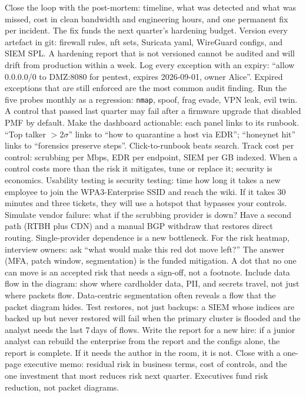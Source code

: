 Close the loop with the post-mortem: timeline, what was detected and what was missed, cost in clean bandwidth and engineering hours, and one permanent fix per incident. The fix funds the next quarter's hardening budget.
Version every artefact in git: firewall rules, nft sets, Suricata yaml, WireGuard configs, and SIEM SPL. A hardening report that is not versioned cannot be audited and will drift from production within a week.
Log every exception with an expiry: ``allow 0.0.0.0/0 to DMZ:8080 for pentest, expires 2026-09-01, owner Alice''. Expired exceptions that are still enforced are the most common audit finding.
Run the five probes monthly as a regression: \texttt{nmap}, spoof, frag evade, VPN leak, evil twin. A control that passed last quarter may fail after a firmware upgrade that disabled PMF by default.
Make the dashboard actionable: each panel links to its runbook. ``Top talker $>$2$\sigma$'' links to ``how to quarantine a host via EDR''; ``honeynet hit'' links to ``forensics preserve steps''. Click-to-runbook beats search.
Track cost per control: scrubbing per Mbps, EDR per endpoint, SIEM per GB indexed. When a control costs more than the risk it mitigates, tune or replace it; security is economics.
Usability testing is security testing: time how long it takes a new employee to join the WPA3-Enterprise SSID and reach the wiki. If it takes 30\,minutes and three tickets, they will use a hotspot that bypasses your controls.
Simulate vendor failure: what if the scrubbing provider is down? Have a second path (RTBH plus CDN) and a manual BGP withdraw that restores direct routing. Single-provider dependence is a new bottleneck.
For the risk heatmap, interview owners: ask ``what would make this red dot move left?'' The answer (MFA, patch window, segmentation) is the funded mitigation. A dot that no one can move is an accepted risk that needs a sign-off, not a footnote.
Include data flow in the diagram: show where cardholder data, PII, and secrets travel, not just where packets flow. Data-centric segmentation often reveals a flow that the packet diagram hides.
Test restores, not just backups: a SIEM whose indices are backed up but never restored will fail when the primary cluster is flooded and the analyst needs the last 7\,days of flows.
Write the report for a new hire: if a junior analyst can rebuild the enterprise from the report and the configs alone, the report is complete. If it needs the author in the room, it is not.
Close with a one-page executive memo: residual risk in business terms, cost of controls, and the one investment that most reduces risk next quarter. Executives fund risk reduction, not packet diagrams.
